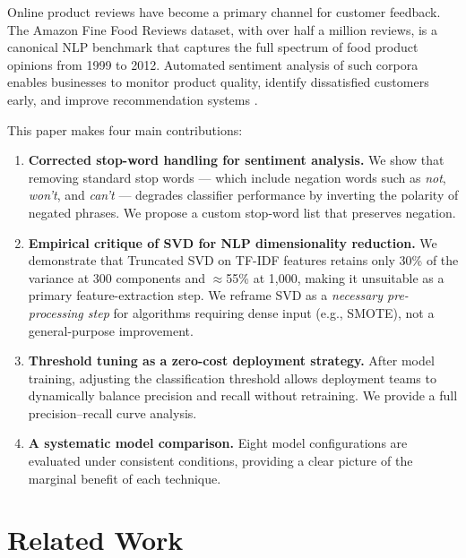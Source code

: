 \documentclass[11pt,a4paper]{article}
\begin{document}
Online product reviews have become a primary channel for customer feedback.
The Amazon Fine Food Reviews dataset, with over half a million reviews, is a
canonical NLP benchmark that captures the full spectrum of food product
opinions from 1999 to 2012.
Automated sentiment analysis of such corpora enables businesses to monitor
product quality, identify dissatisfied customers early, and improve
recommendation systems \citep{pang2008opinion}.

This paper makes four main contributions:

\begin{enumerate}[leftmargin=2em]
  \item \textbf{Corrected stop-word handling for sentiment analysis.}
        We show that removing standard stop words --- which include
        negation words such as \textit{not}, \textit{won't}, and
        \textit{can't} --- degrades classifier performance by inverting
        the polarity of negated phrases.
        We propose a custom stop-word list that preserves negation.

  \item \textbf{Empirical critique of SVD for NLP dimensionality reduction.}
        We demonstrate that Truncated SVD on TF-IDF features retains only
        30\% of the variance at 300 components and $\approx$55\% at 1,000,
        making it unsuitable as a primary feature-extraction step.
        We reframe SVD as a \emph{necessary pre-processing step} for
        algorithms requiring dense input (e.g., SMOTE), not a general-purpose
        improvement.

  \item \textbf{Threshold tuning as a zero-cost deployment strategy.}
        After model training, adjusting the classification threshold allows
        deployment teams to dynamically balance precision and recall without
        retraining. We provide a full precision--recall curve analysis.

  \item \textbf{A systematic model comparison.}
        Eight model configurations are evaluated under consistent conditions,
        providing a clear picture of the marginal benefit of each technique.
\end{enumerate}

\section{Related Work}
\label{sec:related}
\end{document}
